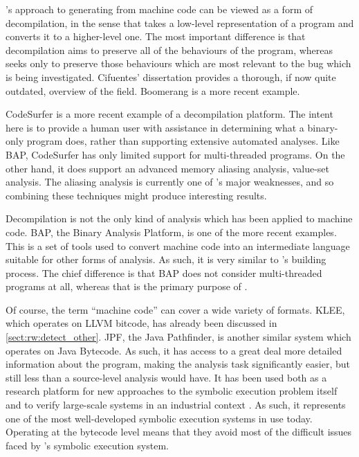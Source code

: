 {\Technique}'s approach to generating {\StateMachines} from machine
code can be viewed as a form of decompilation, in the sense that takes
a low-level representation of a program and converts it to a
higher-level one.  The most important difference is that decompilation
aims to preserve all of the behaviours of the program, whereas
{\technique} seeks only to preserve those behaviours which are most
relevant to the bug which is being investigated.  Cifuentes'
dissertation\cite{Cifuentes1994} provides a thorough, if now quite
outdated, overview of the field.  Boomerang\cite{Emmerik2004} is a
more recent example.

CodeSurfer\cite{Balakrishnan2005a} is a more recent example of a
decompilation platform.  The intent here is to provide a human user
with assistance in determining what a binary-only program does, rather
than supporting extensive automated analyses.  Like BAP, CodeSurfer
has only limited support for multi-threaded programs.  On the other
hand, it does support an advanced memory aliasing analysis, value-set
analysis\cite{Balakrishnan2004}.  The aliasing analysis is currently
one of {\technique}'s major weaknesses, and so combining these
techniques might produce interesting results.  

Decompilation is not the only kind of analysis which has been applied
to machine code.  BAP, the Binary Analysis Platform\cite{Brumley2011},
is one of the more recent examples.  This is a set of tools used to
convert machine code into an intermediate language suitable for other
forms of analysis.  As such, it is very similar to {\technique}'s
{\StateMachine} building process.  The chief difference is that BAP
does not consider multi-threaded programs at all, whereas that is the
primary purpose of {\StateMachine}.



Of course, the term ``machine code'' can cover a wide variety of
formats.  KLEE, which operates on LLVM bitcode, has already been
discussed in \autoref{sect:rw:detect_other}.  JPF, the Java
Pathfinder\cite{Havelund2000}, is another similar system which
operates on Java Bytecode\cite{Lindholm2013}.  As such, it has access to a
great deal more detailed information about the program, making the
analysis task significantly easier, but still less than a source-level
analysis would have.  It has been used both as a research platform for
new approaches to the symbolic execution problem itself  and to verify large-scale
systems in an industrial context .  As such,
it represents one of the most well-developed symbolic execution
systems in use today.  Operating at the bytecode level means that they
avoid most of the difficult issues faced by {\technique}'s symbolic
execution system.


